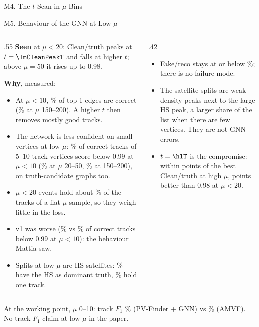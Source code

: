 \begin{frame}{M4. The $t$ Scan in $\mu$ Bins}
\centering
{}
\end{frame}

\begin{frame}{M5. Behaviour of the GNN at Low $\mu$}
\footnotesize
\begin{columns}[T]
\begin{column}{.55\linewidth}\scriptsize
\textbf{Seen} at $\mu<20$: Clean/truth peaks at $t=\lmCleanPeakT$ and falls at higher $t$; above $\mu=50$ it rises up to 0.98.
\par\vspace{.3em}
\textbf{Why}, measured:
\begin{itemize}\setlength\itemsep{.15em}
\item At $\mu<10$, \lmTopOneLow\% of top-1 edges are correct (\lmTopOneHigh\% at $\mu$ 150--200). A higher $t$ then removes mostly good tracks.
\item The network is less confident on small vertices at low $\mu$: \lmSmallBelowLow\% of correct tracks of 5--10-track vertices score below 0.99 at $\mu<10$ (\lmSmallBelowMid\% at $\mu$ 20--50, \lmSmallBelowHigh\% at 150--200), on truth-candidate graphs too.
\item $\mu<20$ events hold about \lmTrackShare\% of the tracks of a flat-$\mu$ sample, so they weigh little in the loss.
\item v1 was worse (\lmVoneBelow\% vs \lmVtwoBelow\% of correct tracks below 0.99 at $\mu<10$): the behaviour Mattia saw.
\item Splits at low $\mu$ are HS satellites: \lmSplitHS\% have the HS as dominant truth, \lmSplitOne\% hold one track.
\end{itemize}
\end{column}
\begin{column}{.42\linewidth}
\begin{itemize}\setlength\itemsep{.25em}
\item Fake/reco stays at or below \lmFakeMax\%; there is no failure mode.
\item The satellite splits are weak density peaks next to the large HS peak, a larger share of the list when there are few vertices. They are not GNN errors.
\item $t=\hlT$ is the compromise: within \optDvsAclean{} points of the best Clean/truth at high $\mu$, \optDvsAlow{} points better than 0.98 at $\mu<20$.
\end{itemize}
\end{column}
\end{columns}
\par\vspace{.2em}
{\scriptsize At the working point, $\mu$ 0--10: track $F_1$ \lmFOneGNN\% (PV-Finder + GNN) vs \lmFOneAMVF\% (AMVF). No track-$F_1$ claim at low $\mu$ in the paper.}
\end{frame}

